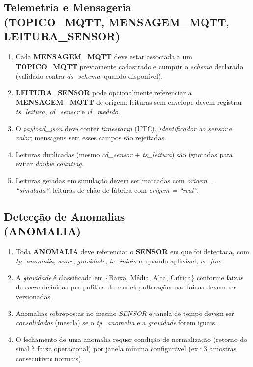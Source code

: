 \documentclass[a4paper,10pt]{article}
\let\oldtextbf\textbf
\renewcommand{\textbf}[1]{{\footnotesize\oldtextbf{#1}}}
\begin{document}
\subsection*{\small Telemetria e Mensageria \\ (TOPICO\_MQTT, MENSAGEM\_MQTT, LEITURA\_SENSOR)}
\begin{enumerate}[label=RN-\arabic*,font=\footnotesize ]
\item Cada \textbf{\footnotesize MENSAGEM\_MQTT} deve estar associada a um \textbf{\footnotesize TOPICO\_MQTT} previamente cadastrado e cumprir o \textit{schema} declarado (validado contra \textit{ds\_schema}, quando disponível).
\item \textbf{\footnotesize LEITURA\_SENSOR} pode opcionalmente referenciar a \textbf{MENSAGEM\_MQTT} de origem; leituras sem envelope devem registrar \textit{ts\_leitura}, \textit{cd\_sensor} e \textit{vl\_medido}.
\item O \textit{payload\_json} deve conter \textit{timestamp} (UTC), \textit{identificador do sensor} e \textit{valor}; mensagens sem esses campos são rejeitadas.
\item Leituras duplicadas (mesmo \textit{cd\_sensor} + \textit{ts\_leitura}) são ignoradas para evitar \emph{double counting}.
\item Leituras geradas em simulação devem ser marcadas com \textit{origem = ``simulada''}; leituras de chão de fábrica com \textit{origem = ``real''}.
\end{enumerate}

\subsection*{\small Detecção de Anomalias \\ (ANOMALIA)}
\begin{enumerate}[label=RN-3.\arabic*, font=\footnotesize]
\item Toda \textbf{ANOMALIA} deve referenciar o \textbf{SENSOR} em que foi detectada, com \textit{tp\_anomalia}, \textit{score}, \textit{gravidade}, \textit{ts\_inicio} e, quando aplicável, \textit{ts\_fim}.
\item A \textit{gravidade} é classificada em \{Baixa, Média, Alta, Crítica\} conforme faixas de \textit{score} definidas por política do modelo; alterações nas faixas devem ser versionadas.
\item Anomalias sobrepostas no mesmo \textit{SENSOR} e janela de tempo devem ser \emph{consolidadas} (mescla) se o \textit{tp\_anomalia} e a \textit{gravidade} forem iguais.
\item O fechamento de uma anomalia requer condição de normalização (retorno do sinal à faixa operacional) por janela mínima configurável (ex.: 3 amostras consecutivas normais).
\end{enumerate}
\end{document}
